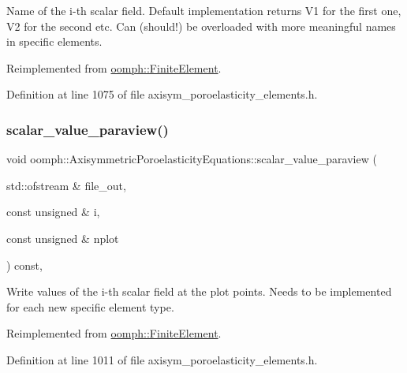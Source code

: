 Name of the i-\/th scalar field. Default implementation returns V1 for the first one, V2 for the second etc. Can (should!) be overloaded with more meaningful names in specific elements. 



Reimplemented from \hyperlink{classoomph_1_1FiniteElement_a49cc2d4f7ed5772bbc96f06760372b51}{oomph\+::\+Finite\+Element}.



Definition at line 1075 of file axisym\+\_\+poroelasticity\+\_\+elements.\+h.

\mbox{\label{classoomph_1_1AxisymmetricPoroelasticityEquations_a1131ce60ca4c3ad6b213913447e4ac69}} 
\subsubsection{\texorpdfstring{scalar\+\_\+value\+\_\+paraview()}{scalar\_value\_paraview()}}
{\footnotesize\ttfamily void oomph\+::\+Axisymmetric\+Poroelasticity\+Equations\+::scalar\+\_\+value\+\_\+paraview (\begin{DoxyParamCaption}\item[{std\+::ofstream \&}]{file\+\_\+out,  }\item[{const unsigned \&}]{i,  }\item[{const unsigned \&}]{nplot }\end{DoxyParamCaption}) const\hspace{0.3cm}{\ttfamily [inline]}, {\ttfamily [virtual]}}



Write values of the i-\/th scalar field at the plot points. Needs to be implemented for each new specific element type. 



Reimplemented from \hyperlink{classoomph_1_1FiniteElement_a02cf8832a5e2886f1572bd36f7a7c1e3}{oomph\+::\+Finite\+Element}.



Definition at line 1011 of file axisym\+\_\+poroelasticity\+\_\+elements.\+h.



